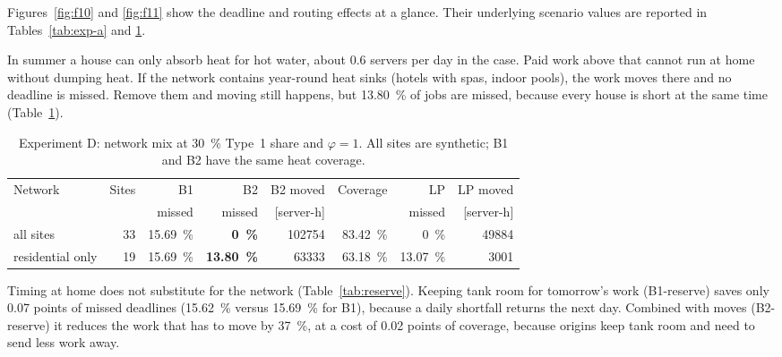 Figures~\ref{fig:f10} and \ref{fig:f11} show the deadline and routing effects at a glance.
Their underlying scenario values are reported in Tables~\ref{tab:exp-a} and \ref{tab:exp-d}.



In summer a house can only absorb heat for hot water, about 0.6 servers per day in the case. Paid
work above that cannot run at home without dumping heat. If the network contains year-round heat
sinks (hotels with spas, indoor pools), the work moves there and no deadline is missed. Remove them
and moving still happens, but \qty{13.80}{\percent} of jobs are missed, because every house is short
at the same time (Table~\ref{tab:exp-d}).

\begin{table}[ht]
  \centering
  \caption{Experiment D: network mix at \qty{30}{\percent} Type~1 share and $\varphi=1$.
    All sites are synthetic; B1 and B2 have the same heat coverage.}
  \label{tab:exp-d}
  \small
  \begin{tabular}{lrrrrrrr}
    \toprule
    Network & Sites & B1 & B2 & B2 moved & Coverage & LP & LP moved \\
    & & missed & missed & [server-h] & & missed & [server-h] \\
    \midrule
    all sites & 33 & \qty{15.69}{\percent} & \textbf{\qty{0}{\percent}} & \num{102754} & \qty{83.42}{\percent} & \qty{0}{\percent} & \num{49884} \\
    residential only & 19 & \qty{15.69}{\percent} & \textbf{\qty{13.80}{\percent}} & \num{63333} & \qty{63.18}{\percent} & \qty{13.07}{\percent} & \num{3001} \\
    \bottomrule
  \end{tabular}
\end{table}

Timing at home does not substitute for the network (Table~\ref{tab:reserve}). Keeping tank room for
tomorrow's work (B1-reserve) saves only 0.07 points of missed deadlines (\qty{15.62}{\percent}
versus \qty{15.69}{\percent} for B1), because a daily shortfall returns the next day. Combined with moves (B2-reserve) it reduces the work that has to move by
\qty{37}{\percent}, at a cost of 0.02 points of coverage, because origins keep tank room and need to
send less work away.

